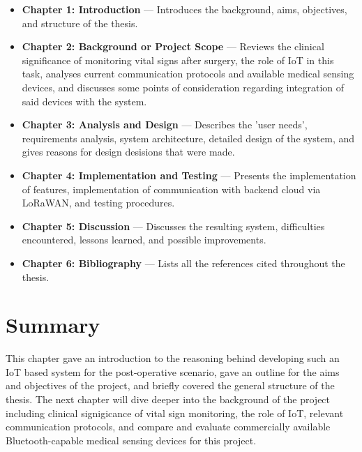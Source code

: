 \begin{itemize}
	\item \textbf{Chapter 1: Introduction} --- Introduces the background, aims, objectives, and structure of the thesis.
	\item \textbf{Chapter 2: Background or Project Scope} --- Reviews the clinical significance of monitoring vital signs after surgery, the role of IoT in this task, analyses current communication protocols and available medical sensing devices, and discusses some points of consideration regarding integration of said devices with the system.
	\item \textbf{Chapter 3: Analysis and Design} --- Describes the 'user needs', requirements analysis, system architecture, detailed design of the system, and gives reasons for design desisions that were made.
	\item \textbf{Chapter 4: Implementation and Testing} --- Presents the implementation of features, implementation of communication with backend cloud via LoRaWAN, and testing procedures.
	\item \textbf{Chapter 5: Discussion} --- Discusses the resulting system, difficulties encountered, lessons learned, and possible improvements.
	\item \textbf{Chapter 6: Bibliography} --- Lists all the references cited throughout the thesis.
\end{itemize}

\section{Summary} %
This chapter gave an introduction to the reasoning behind developing such an IoT based system for the post-operative scenario, gave an outline for the aims and objectives of the project, and briefly covered the general structure of the thesis. The next chapter will dive deeper into the background of the project including clinical signigicance of vital sign monitoring, the role of IoT, relevant communication protocols, and compare and evaluate commercially available Bluetooth-capable medical sensing devices for this project.
